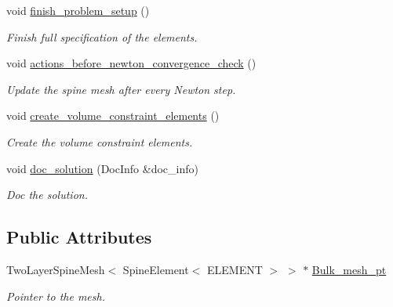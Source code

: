 \begin{DoxyCompactItemize}
void \hyperlink{classCapProblem_a5dab5b1ae1d41cb23ac2bcb08fb3dc22}{finish\+\_\+problem\+\_\+setup} ()
\begin{DoxyCompactList}\small\item\em Finish full specification of the elements. \end{DoxyCompactList}\item 
void \hyperlink{classCapProblem_ac852570b51489f4bf744b6063fbfa01a}{actions\+\_\+before\+\_\+newton\+\_\+convergence\+\_\+check} ()
\begin{DoxyCompactList}\small\item\em Update the spine mesh after every Newton step. \end{DoxyCompactList}\item 
void \hyperlink{classCapProblem_aa3a891fe6f5fc5fb5829e3bf636eda2c}{create\+\_\+volume\+\_\+constraint\+\_\+elements} ()
\begin{DoxyCompactList}\small\item\em Create the volume constraint elements. \end{DoxyCompactList}\item 
void \hyperlink{classCapProblem_a8549ca722d2d151ebf3ef7b35b925fbb}{doc\+\_\+solution} (Doc\+Info \&doc\+\_\+info)
\begin{DoxyCompactList}\small\item\em Doc the solution. \end{DoxyCompactList}\end{DoxyCompactItemize}
\subsection*{Public Attributes}
\begin{DoxyCompactItemize}
\item 
Two\+Layer\+Spine\+Mesh$<$ Spine\+Element$<$ E\+L\+E\+M\+E\+NT $>$ $>$ $\ast$ \hyperlink{classCapProblem_a98e8297aaedfba8624e3eb3aae29a237}{Bulk\+\_\+mesh\+\_\+pt}
\begin{DoxyCompactList}\small\item\em Pointer to the mesh. \end{DoxyCompactList}\end{DoxyCompactItemize}
